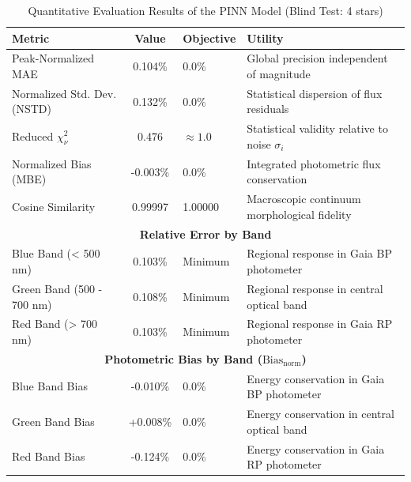 
\begin{table}[htpb]
\centering
\caption{Quantitative Evaluation Results of the PINN Model (Blind Test: 4 stars)}
\label{tab:pinn_evaluation}
\begin{tabular}{lcll}
\hline
\textbf{Metric} & \textbf{Value} & \textbf{Objective} & \textbf{Utility} \\
\hline
Peak-Normalized MAE & 0.104\% & 0.0\% & Global precision independent of magnitude \\
Normalized Std. Dev. (NSTD) & 0.132\% & 0.0\% & Statistical dispersion of flux residuals \\
Reduced $\chi^2_\nu$ & 0.476 & $\approx 1.0$ & Statistical validity relative to noise $\sigma_i$ \\
Normalized Bias (MBE) & -0.003\% & 0.0\% & Integrated photometric flux conservation \\
Cosine Similarity & 0.99997 & 1.00000 & Macroscopic continuum morphological fidelity \\
\hline
\multicolumn{4}{c}{\textbf{Relative Error by Band}} \\
\hline
Blue Band (< 500 nm) & 0.103\% & Minimum & Regional response in Gaia BP photometer \\
Green Band (500 - 700 nm) & 0.108\% & Minimum & Regional response in central optical band \\
Red Band (> 700 nm) & 0.103\% & Minimum & Regional response in Gaia RP photometer \\
\hline
\multicolumn{4}{c}{\textbf{Photometric Bias by Band ($\text{Bias}_{\text{norm}}$)}} \\
\hline
Blue Band Bias & -0.010\% & 0.0\% & Energy conservation in Gaia BP photometer \\
Green Band Bias & +0.008\% & 0.0\% & Energy conservation in central optical band \\
Red Band Bias & -0.124\% & 0.0\% & Energy conservation in Gaia RP photometer \\
\hline
\end{tabular}
\end{table}

